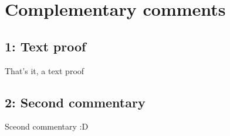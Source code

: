 \chapter[Ordered by reference, not by aparition]{Complementary comments}

\section {1: Text proof}

That's it, a text proof

\newpage

\section {2: Second commentary}

Sceond commentary :D

\newpage